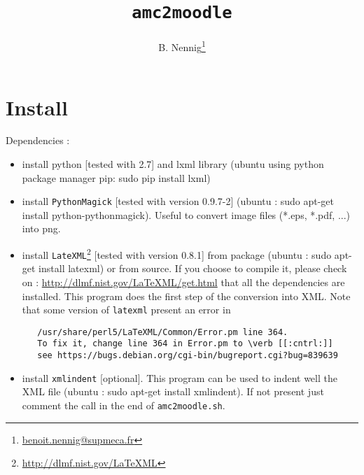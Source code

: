 \documentclass[a4paper]{article}
\title{\texttt{amc2moodle}}
\author{B. Nennig\footnote{\url{benoit.nennig@supmeca.fr}}}
\begin{document}
\maketitle 

\begin{abstract}
	
\end{abstract}


\tableofcontents	
\newpage
\section{Install}
Dependencies :
\begin{itemize}
	\item install python [tested with 2.7] and lxml library (ubuntu using python package manager pip: sudo pip install lxml)
    \item install \texttt{PythonMagick} [tested with version 0.9.7-2] (ubuntu : sudo apt-get install python-pythonmagick). Useful to convert image files (*.eps, *.pdf, ...) into png.
    \item install \texttt{LateXML}\footnote{\url{http://dlmf.nist.gov/LaTeXML}} [tested with version 0.8.1] from package (ubuntu : sudo apt-get install latexml) or from source. If you choose to compile it, please check on :   
     \url{http://dlmf.nist.gov/LaTeXML/get.html}  that all the dependencies are installed. This program does the first step of the conversion into XML. Note that some version of \texttt{latexml} present an error in  
\begin{verbatim}
   /usr/share/perl5/LaTeXML/Common/Error.pm line 364.  
   To fix it, change line 364 in Error.pm to \verb [[:cntrl:]]
   see https://bugs.debian.org/cgi-bin/bugreport.cgi?bug=839639
     \end{verbatim}
    \item install \texttt{xmlindent} [optional]. This program can be used to indent well the XML file (ubuntu : sudo apt-get install xmlindent). If not present just comment the call in the end of \texttt{amc2moodle.sh}.
\end{itemize}
\end{document}
